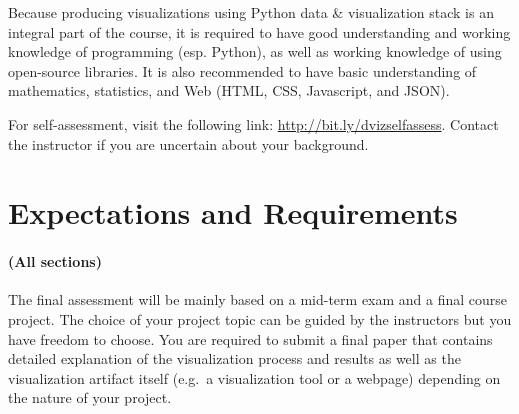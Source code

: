 \documentclass[11pt,article,oneside]{memoir} %
\begin{document}
Because producing visualizations using Python data \& visualization stack is an integral part of the course, it is required to have good understanding and working knowledge of programming (esp. Python), as well as working knowledge of using open-source libraries. 
It is also recommended to have basic understanding of mathematics, statistics, and Web (HTML, CSS, Javascript, and JSON). 


For self-assessment, visit the following link: \href{http://bit.ly/dvizselfassess}{http://bit.ly/dvizselfassess}. 
Contact the instructor if you are uncertain about your background. 

\section{Expectations and Requirements}%
\label{sec:requirements}

\paragraph{(All sections)} 
The final assessment will be mainly based on a mid-term exam and a final course project. 
The choice of your project topic can be guided by the instructors but you have freedom to choose.
You are required to submit a final paper that contains detailed explanation of the visualization process and results as well as the visualization artifact itself (e.g.~a visualization tool or a webpage) depending on the nature of your project. 
\end{document}
